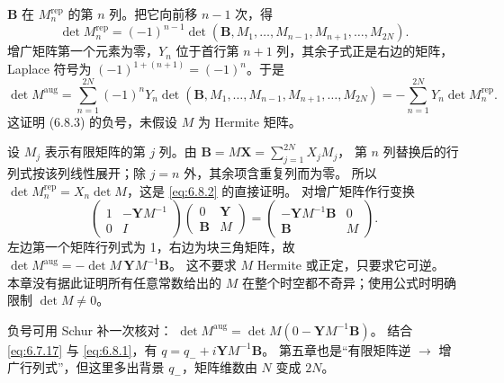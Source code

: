 \documentclass[lang=cn,scheme=chinese,mode=simple,device=normal,color=blue,
math=cm,thmcnt=section,12pt]{elegantbook}
\begin{document}
\begin{callout}[计算：增广行列式按首行展开时的两个符号]
    $\boldsymbol B$ 在 $M_n^{\mathrm{rep}}$ 的第 $n$ 列。把它向前移 $n-1$ 次，得
    \[
        \det M_n^{\mathrm{rep}}=(-1)^{n-1}\det(\boldsymbol B,M_1,\ldots,M_{n-1},M_{n+1},\ldots,M_{2N}).
    \]
    增广矩阵第一个元素为零，$Y_n$ 位于首行第 $n+1$ 列，其余子式正是右边的矩阵，Laplace 符号为 $(-1)^{1+(n+1)}=(-1)^n$。于是
    \[
        \det M^{\mathrm{aug}}=\sum\limits_{n=1}^{2N}(-1)^nY_n\det(\boldsymbol B,M_1,\ldots,M_{n-1},M_{n+1},\ldots,M_{2N})
        =-\sum\limits_{n=1}^{2N}Y_n\det M_n^{\mathrm{rep}}.
    \]
    这证明 (6.8.3) 的负号，未假设 $M$ 为 Hermite 矩阵。
\end{callout}


\begin{callout}
    设 $M_j$ 表示有限矩阵的第 $j$ 列。由 $\boldsymbol B=M\boldsymbol X=\displaystyle\sum\limits_{j=1}^{2N}X_jM_j$，
    第 $n$ 列替换后的行列式按该列线性展开；除 $j=n$ 外，其余项含重复列而为零。
    所以 $\det M_n^{\mathrm{rep}}=X_n\det M$，这是 \eqref{eq:6.8.2} 的直接证明。
    对增广矩阵作行变换
    \[
        \begin{pmatrix}1&-\boldsymbol YM^{-1}\\0&I\end{pmatrix}
        \begin{pmatrix}0&\boldsymbol Y\\\boldsymbol B&M\end{pmatrix}
        =\begin{pmatrix}-\boldsymbol YM^{-1}\boldsymbol B&0\\\boldsymbol B&M\end{pmatrix}.
    \]
    左边第一个矩阵行列式为 1，右边为块三角矩阵，故
    $\det M^{\mathrm{aug}}=-\det M\,\boldsymbol YM^{-1}\boldsymbol B$。
    这不要求 $M$ Hermite 或正定，只要求它可逆。
    本章没有据此证明所有任意常数给出的 $M$ 在整个时空都不奇异；使用公式时明确限制 $\det M\ne0$。
\end{callout}




负号可用 Schur 补一次核对：
$\det M^{\mathrm{aug}}=\det M(0-\boldsymbol YM^{-1}\boldsymbol B)$。
结合 \eqref{eq:6.7.17} 与 \eqref{eq:6.8.1}，有 $q=q_-+i\boldsymbol YM^{-1}\boldsymbol B$。
第五章也是“有限矩阵逆 $\to$ 增广行列式”，但这里多出背景 $q_-$，矩阵维数由 $N$ 变成 $2N$。
\end{document}
